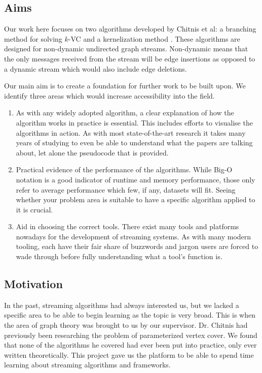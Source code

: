 \subsection{Aims}

Our work here focuses on two algorithms developed by Chitnis et al: a branching
method for solving \(k\)-VC \cite{chitnis2019towards} and a kernelization
method \cite{chitnis2015parameterized}. These algorithms are designed for
non-dynamic undirected graph streams. Non-dynamic means that the only messages
received from the stream will be edge insertions as opposed to a dynamic stream
which would also include edge deletions.

Our main aim is to create a foundation for further work to be built upon. We
identify three areas which would increase accessibility into the field.

\begin{enumerate}
    \item
          As with any widely adopted algorithm, a clear explanation of how the
          algorithm works in practice is essential. This includes efforts to
          visualise the algorithms in action. As with most state-of-the-art
          research it takes many years of studying to even be able to
          understand what the papers are talking about, let alone the
          pseudocode that is provided.
    \item
          Practical evidence of the performance of the algorithms. While Big-O
          notation is a good indicator of runtime and memory performance, those
          only refer to average performance which few, if any, datasets will
          fit. Seeing whether your problem area is suitable to have a specific
          algorithm applied to it is crucial.
    \item
          Aid in choosing the correct tools. There exist many tools and
          platforms nowadays for the development of streaming systems. As with
          many modern tooling, each have their fair share of buzzwords and
          jargon users are forced to wade through before fully understanding
          what a tool's function is.
\end{enumerate}

\subsection{Motivation}

In the past, streaming algorithms had always interested us, but we lacked a
specific area to be able to begin learning as the topic is very broad. This is
when the area of graph theory was brought to us by our supervisor. Dr. Chitnis
had previously been researching the problem of parameterized vertex cover. We
found that none of the algorithms he covered had ever been put into practice,
only ever written theoretically. This project gave us the platform to be able
to spend time learning about streaming algorithms and frameworks.
